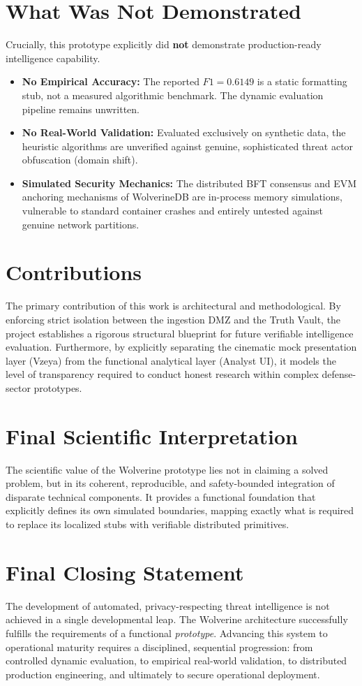 \section{What Was Not Demonstrated}
\label{sec:conc-not-demonstrated}
Crucially, this prototype explicitly did \textbf{not} demonstrate production-ready intelligence capability.
\begin{itemize}
    \item \textbf{No Empirical Accuracy:} The reported $F1=0.6149$ is a static formatting stub, not a measured algorithmic benchmark. The dynamic evaluation pipeline remains unwritten.
    \item \textbf{No Real-World Validation:} Evaluated exclusively on synthetic data, the heuristic algorithms are unverified against genuine, sophisticated threat actor obfuscation (domain shift).
    \item \textbf{Simulated Security Mechanics:} The distributed BFT consensus and EVM anchoring mechanisms of WolverineDB are in-process memory simulations, vulnerable to standard container crashes and entirely untested against genuine network partitions.
\end{itemize}

\section{Contributions}
\label{sec:conc-contributions}
The primary contribution of this work is architectural and methodological. By enforcing strict isolation between the ingestion DMZ and the Truth Vault, the project establishes a rigorous structural blueprint for future verifiable intelligence evaluation. Furthermore, by explicitly separating the cinematic mock presentation layer (Vzeya) from the functional analytical layer (Analyst UI), it models the level of transparency required to conduct honest research within complex defense-sector prototypes.

\section{Final Scientific Interpretation}
\label{sec:conc-interpretation}
The scientific value of the Wolverine prototype lies not in claiming a solved problem, but in its coherent, reproducible, and safety-bounded integration of disparate technical components. It provides a functional foundation that explicitly defines its own simulated boundaries, mapping exactly what is required to replace its localized stubs with verifiable distributed primitives.

\section{Final Closing Statement}
\label{sec:conc-closing}
The development of automated, privacy-respecting threat intelligence is not achieved in a single developmental leap. The Wolverine architecture successfully fulfills the requirements of a functional \textit{prototype}. Advancing this system to operational maturity requires a disciplined, sequential progression: from controlled dynamic evaluation, to empirical real-world validation, to distributed production engineering, and ultimately to secure operational deployment.
